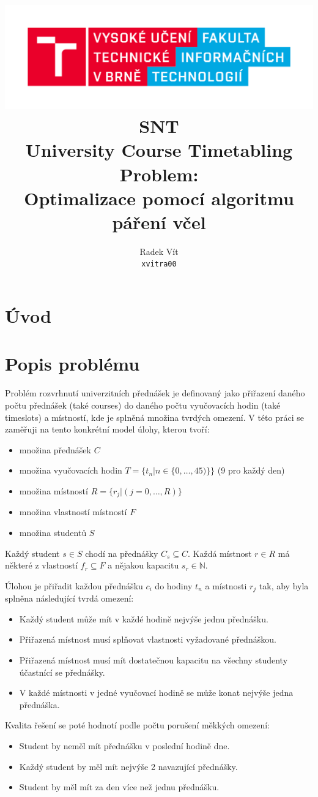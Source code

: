 \documentclass[12pt, a4paper]{article}
\author{Radek Vít\\ \texttt{xvitra00}}
\title{
	\includegraphics[scale=0.6]{FIT_barevne_PANTONE_CZ.pdf}\\
	SNT\\
	University Course Timetabling Problem:\\ Optimalizace pomocí algoritmu páření včel
}
\begin{document}
\newpage
\maketitle

\section{Úvod}
\section{Popis problému}
Problém rozvrhnutí univerzitních přednášek je definovaný jako %
přiřazení daného počtu přednášek (také courses) do daného počtu vyučovacích hodin (také timeslots) a místností,
kde je splněná množina tvrdých omezení. %
V této práci se zaměřuji na tento konkrétní model úlohy, kterou tvoří:
\begin{itemize}
  \item množina přednášek $C$
  \item množina vyučovacích hodin $T = \{t_n | n \in \{0, \dots, 45)\}\}$ (9 pro každý den)
  \item množina místností $R = \{r_j | (j = 0, \dots, R)\}$
  \item množina vlastností místností $F$
  \item množina studentů $S$
\end{itemize}
Každý student $s \in S$ chodí na přednášky $C_s \subseteq C$. Každá místnost $r \in R$ má některé z vlastností $f_r \subseteq F$ a nějakou kapacitu $s_r \in \mathbb{N}$.

Úlohou je přiřadit každou přednášku $c_i$ do hodiny $t_n$ a místnosti $r_j$ tak, aby byla splněna následující tvrdá omezení:
\begin{itemize}
  \item Každý student může mít v každé hodině nejvýše jednu přednášku.
  \item Přiřazená místnost musí splňovat vlastnosti vyžadované přednáškou.
  \item Přiřazená místnost musí mít dostatečnou kapacitu na všechny studenty účastnící se přednášky.
  \item V každé místnosti v jedné vyučovací hodině se může konat nejvýše jedna přednáška.
\end{itemize}
Kvalita řešení se poté hodnotí podle počtu porušení měkkých omezení:
\begin{itemize}
  \item Student by neměl mít přednášku v poslední hodině dne.
  \item Každý student by měl mít nejvýše 2 navazující přednášky.
  \item Student by měl mít za den více než jednu přednášku.
\end{itemize}
\end{document}
